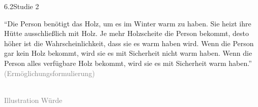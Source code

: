 \documentclass[xcolor=table,9pt,aspectratio=169]{beamer}
\begin{document}
\begin{frame}{\vspace*{10mm}6.2\hspace*{1em}Studie 2}
\begin{multicols}{2}
   \enquote{Die Person benötigt das Holz, um es im Winter warm zu haben. Sie heizt ihre Hütte ausschließlich mit Holz. Je mehr Holzscheite die Person bekommt, desto höher ist die Wahrscheinlichkeit, dass sie es warm haben wird. Wenn die Person gar kein Holz bekommt, wird sie es mit Sicherheit nicht warm haben. Wenn die Person alles verfügbare Holz bekommt, wird sie es mit Sicherheit warm haben.}\\
   \medskip
   \textcolor{gray}{(Ermöglichungsformulierung)}
   \vfill
   \begin{center}
      \\
      \footnotesize{\textcolor{gray}{Illustration Würde}}
   \end{center}
\end{multicols}
\end{frame}
\end{document}
